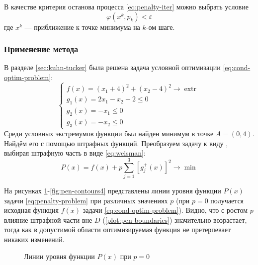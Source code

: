 \documentclass{article}
\renewcommand{\epsilon}{\varepsilon}
\renewcommand{\phi}{\varphi}
\renewcommand{\leq}{\leqslant}
\DeclareMathOperator{\extr}{extr}
\theoremstyle{remark}
\theoremstyle{definition}
\numberwithin{equation}{section}
\begin{document}
В качестве критерия останова процесса \eqref{eq:penalty-iter} можно
выбрать условие
\begin{equation*}
  \phi(x^k, p_k) < \epsilon
\end{equation*}
где $x^k$ — приближение к точке минимума на $k$-ом шаге.

\subsubsection{Применение метода}
\label{sec:penalty-usage}

В разделе \ref{sec:kuhn-tucker} была решена задача условной
оптимизации \eqref{eq:cond-optim-problem}:
\begin{equation*}
  \begin{cases}
    f(x) = (x_1+4)^2 + (x_2-4)^2 \to \extr \\
    g_1(x) = 2x_1 - x_2 - 2 \leq 0 \\
    g_2(x) = -x_1 \leq 0 \\
    g_3(x) = -x_2 \leq 0
  \end{cases}
\end{equation*}
Среди условных экстремумов функции был найден минимум в точке $A = (0,
4)$. Найдём его с помощью штрафных функций. Преобразуем задачу к виду
\label{eq:penalty-iter}, выбирая штрафную часть в виде
\eqref{eq:weisman}:
\begin{equation}
  \label{eq:penalty-problem}
  P(x) = f(x) + p \sum_{j=1}^3{ \left [ g_j^+(x) \right ]^2} \to \min
\end{equation}

На рисунках \ref{fig:pen-contours1}-\ref{fig:pen-contours4}
представлены линии уровня функции $P(x)$ задачи
\eqref{eq:penalty-problem} при различных значениях $p$ (при $p=0$
получается исходная функция $f(x)$ задачи
\eqref{eq:cond-optim-problem}). Видно, что с ростом $p$ влияние
штрафной части вне $D$ (\ref{plot:pen-boundaries}) значительно
возрастает, тогда как в допустимой области оптимизируемая функция не
претерпевает никаких изменений.

\begin{figure}[!thb]
  \centering
  \caption{Линии уровня функции $P(x)$ при $p=0$}
  \label{fig:pen-contours1}
\end{figure}
\end{document}
